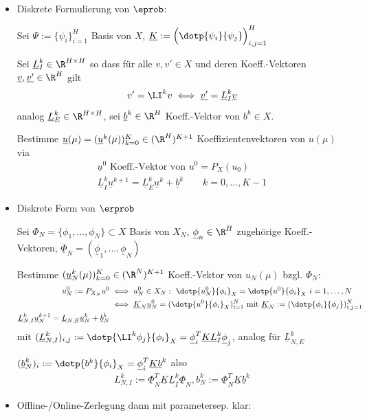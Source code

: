 \begin{itemize}
	\item Diskrete Formulierung von $\eprob$:
	
	Sei $\Psi := \{\psi_i\}_{i=1}^H$ Basis von $X$, $\underline{K}:= \Big(\dotp{\psi_i}{\psi_j} \Big)_{i,j=1}^H$
	
	Sei $\underline{L}_I^k \in \R^{H \times H}$ so dass für alle $v, v' \in X$ und deren Koeff.-Vektoren $\underline{v}, \underline{v'} \in \R^H$ gilt
	\[
		v' = \LI^k v \iff \underline{v'} = \underline{L}_I^k \underline{v}
	\]
	analog $\underline{L}_E^k \in \R^{H \times H}$, sei $\underline{b}^k \in \R^H$ Koeff.-Vektor von $b^k \in X$.
	
	Bestimme $\underline{u}(\mu) = (\underline{u}^k(\mu))_{k=0}^K \in (\R^H)^{K+1}$ Koeffizientenvektoren von $u(\mu)$ via
	\begin{align*}
		\underline{u}^0 \text{ Koeff.-Vektor von } u^0 = P_X(u_0) \\
		\underline{L}_I^k \underline{u}^{k+1} = \underline{L}_E^k \underline{u}^k + \underline{b}^k \qquad k=0,\dots,K-1
	\end{align*}
	\item Diskrete Form von $\erprob$
	
	Sei $\Phi_N = \{\phi_1,\dots,\phi_N\} \subset X$ Basis von $X_N$, $\underline{\phi}_n \in \R^H$ zugehörige Koeff.-Vektoren, $\underline{\Phi}_N = (\underline{\phi}_1,\dots,\underline{\phi}_N)$
	
	Bestimme $(\underline{u}_N^k(\mu))_{k=0}^K \in (\R^N)^{K+1}$ Koeff.-Vektor von $u_N(\mu)$ bzgl. $\Phi_N$:
	\begin{align}
	u_N^0 := P_{X_N} u^0 &\iff u_N^0 \in X_N: \,\, \dotp{u_N^0}{\phi_i}_X = \dotp{u^0}{\phi_i}_X \,\, i=1,\dots,N \notag \\
	&\iff \underline{K}_N \underline{u}_N^0 = (\dotp{u^0}{\phi_i}_X)_{i=1}^N \text{ mit } \underline{K}_N := (\dotp{\phi_i}{\phi_j})_{i,j=1}^N  \label{eq:6.2}\\
	\underline{L}_{N,I}^k \underline{u}_N^{k+1} = \underline{L}_{N,E} \underline{u}_N^k + \underline{b}_N^k \label{eq:6.3}
	\end{align}
	mit $(\underline{L}_{N,I}^k)_{i,j} :=\dotp{\LI^k \phi_j}{\phi_i}_X = \underline{\phi}_i^T \underline{K} \underline{L}_I^k \underline{\phi}_j$, analog für $\underline{L}_{N,E}^k$
	
	$(\underline{b}_N^k)_i := \dotp{b^k}{\phi_i}_X = \underline{\phi}_i^T \underline{K} \underline{b}^k$ also
	\begin{align} \label{eq:6.4}
	L_{N,I}^k := \underline{\Phi}_N^T \underline{K} \underline{L}_I^k \underline{\Phi}_N, b_N^k := \underline{\Phi}_N^T \underline{K} \underline{b}^k
	\end{align}
	\item Offline-/Online-Zerlegung dann mit parametersep. klar:
	

\end{itemize}
